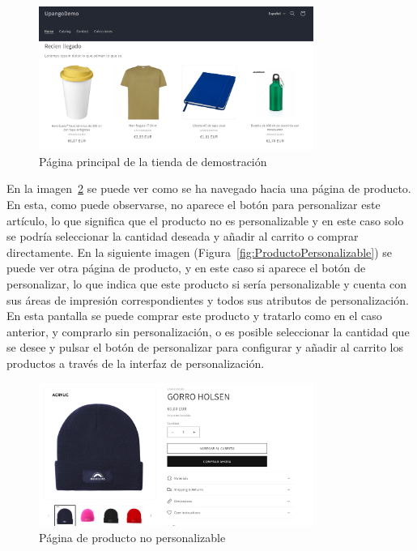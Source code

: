 \documentclass[12pt]{article}
\begin{document}
\begin{figure}[ht]
    \centering
    \includegraphics[width=0.8\textwidth]{imagenes/ManualUsuario/HomeTiendaDemo.png}
    \caption{\label{fig:HomeTiendaDemo}Página principal de la tienda de demostración}
    \vspace{\fill}
\end{figure}

En la imagen~\ref{fig:ProductoNoPersonalizable} se puede ver como se ha navegado hacia una página de producto. En esta, como puede observarse, no aparece el botón para personalizar este
artículo, lo que significa que el producto no es personalizable y en este caso solo se podría seleccionar la cantidad deseada y añadir al carrito o comprar directamente.
En la siguiente imagen (Figura~\ref{fig:ProductoPersonalizable}) se puede ver otra página de producto, y en este caso si aparece el botón de personalizar, lo que indica que este producto
si sería personalizable y cuenta con sus áreas de impresión correspondientes y todos sus atributos de personalización. En esta pantalla se puede comprar este producto y tratarlo como en el caso anterior,
y comprarlo sin personalización, o es posible seleccionar la cantidad que se desee y pulsar el botón de personalizar para configurar y añadir al carrito los productos a través de la interfaz de personalización.

\begin{figure}[ht]
    \centering
    \includegraphics[width=0.8\textwidth]{imagenes/ManualUsuario/PaginaProductoSinPersonalizacion.png}
    \caption{\label{fig:ProductoNoPersonalizable}Página de producto no personalizable}
    \vspace{\fill}
\end{figure}
\end{document}
